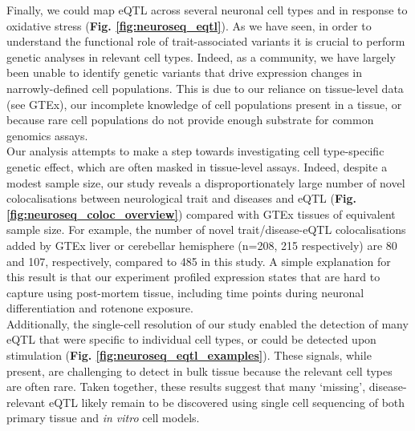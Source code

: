 
Finally,
we could map eQTL across several neuronal cell types and in response to oxidative stress (\textbf{Fig. \ref{fig:neuroseq_eqtl}}).
As we have seen, in order to understand the functional role of trait-associated variants it is crucial to perform genetic analyses in relevant cell types.
Indeed, as a community, we have largely been unable to identify genetic variants that drive expression changes in narrowly-defined cell populations.
This is due to our reliance on tissue-level data (see GTEx), our incomplete knowledge of cell populations present in a tissue, or because rare cell populations do not provide enough substrate for common genomics assays. \\

Our analysis attempts to make a step towards investigating cell type-specific genetic effect, which are often masked in tissue-level assays.
Indeed, despite a modest sample size, our study reveals a disproportionately large number of novel colocalisations between neurological trait and diseases and eQTL (\textbf{Fig. \ref{fig:neuroseq_coloc_overview}}) compared with GTEx tissues of equivalent sample size. 
For example, the number of novel trait/disease-eQTL colocalisations added by GTEx liver or cerebellar hemisphere (n=208, 215 respectively) are 80 and 107, respectively, compared to 485 in this study. 
A simple explanation for this result is that our experiment profiled expression states that are hard to capture using post-mortem tissue, including time points during neuronal differentiation and rotenone exposure. \\

Additionally, the single-cell resolution of our study enabled the detection of many eQTL that were specific to individual cell types, or could be detected upon stimulation (\textbf{Fig. \ref{fig:neuroseq_eqtl_examples}}).
These signals, while present, are challenging to detect in bulk tissue because the relevant cell types are often rare. 
Taken together, these results suggest that many `missing', disease-relevant eQTL likely remain to be discovered using single cell sequencing of both primary tissue and \textit{in vitro} cell models.\\



